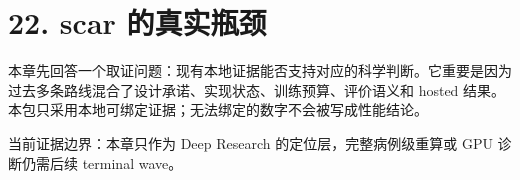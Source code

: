 \section{22. scar 的真实瓶颈}

本章先回答一个取证问题：现有本地证据能否支持对应的科学判断。它重要是因为过去多条路线混合了设计承诺、实现状态、训练预算、评价语义和 hosted 结果。本包只采用本地可绑定证据；无法绑定的数字不会被写成性能结论。



当前证据边界：本章只作为 Deep Research 的定位层，完整病例级重算或 GPU 诊断仍需后续 terminal wave。



\clearpage